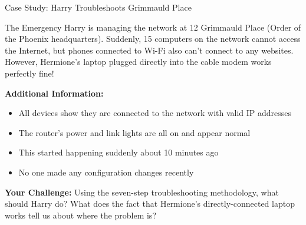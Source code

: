 \documentclass[aspectratio=169]{beamer}
\begin{document}
\begin{frame}{Case Study: Harry Troubleshoots Grimmauld Place}

\begin{alertblock}{The Emergency}
Harry is managing the network at 12 Grimmauld Place (Order of the Phoenix headquarters). Suddenly, 15 computers on the network cannot access the Internet, but phones connected to Wi-Fi also can't connect to any websites. However, Hermione's laptop plugged directly into the cable modem works perfectly fine!
\end{alertblock}

\vspace{0.3cm}

\textbf{Additional Information:}
\begin{itemize}
    \item All devices show they are connected to the network with valid IP addresses
    \item The router's power and link lights are all on and appear normal
    \item This started happening suddenly about 10 minutes ago
    \item No one made any configuration changes recently
\end{itemize}

\vspace{0.3cm}

\textbf{Your Challenge:}
Using the seven-step troubleshooting methodology, what should Harry do? What does the fact that Hermione's directly-connected laptop works tell us about where the problem is?

\end{frame}
\end{document}
